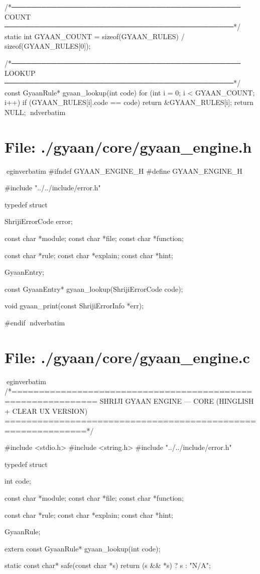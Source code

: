 \documentclass{article}
\begin{document}
/*──────────────────────────────────────────────
  COUNT
──────────────────────────────────────────────*/
static int GYAAN_COUNT =
sizeof(GYAAN_RULES) / sizeof(GYAAN_RULES[0]);

/*──────────────────────────────────────────────
  LOOKUP
──────────────────────────────────────────────*/
const GyaanRule* gyaan_lookup(int code)
{
    for (int i = 0; i < GYAAN_COUNT; i++) {
        if (GYAAN_RULES[i].code == code) {
            return &GYAAN_RULES[i];
        }
    }
    return NULL;
}
nd{verbatim}
\section*{File: ./gyaan/core/gyaan_engine.h}
egin{verbatim}
#ifndef GYAAN_ENGINE_H
#define GYAAN_ENGINE_H

#include "../../include/error.h"

typedef struct {

    ShrijiErrorCode error;

    const char *module;
    const char *file;
    const char *function;

    const char *rule;
    const char *explain;
    const char *hint;

} GyaanEntry;

const GyaanEntry* gyaan_lookup(ShrijiErrorCode code);

void gyaan_print(const ShrijiErrorInfo *err);

#endif
nd{verbatim}
\section*{File: ./gyaan/core/gyaan_engine.c}
egin{verbatim}
/*=============================================================
  SHRIJI GYAAN ENGINE — CORE (HINGLISH + CLEAR UX VERSION)
=============================================================*/

#include <stdio.h>
#include <string.h>
#include "../../include/error.h"

typedef struct {
    int code;

    const char *module;
    const char *file;
    const char *function;

    const char *rule;
    const char *explain;
    const char *hint;

} GyaanRule;

extern const GyaanRule* gyaan_lookup(int code);

static const char* safe(const char *s)
{
    return (s && *s) ? s : "N/A";
}
\end{document}
